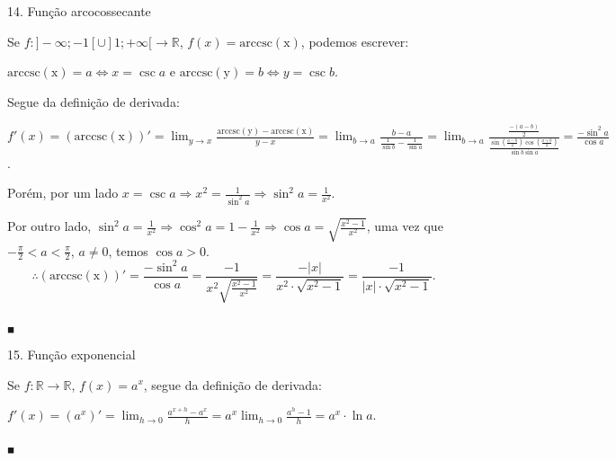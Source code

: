 \documentclass{article}
\begin{document}
{\begin{newpage}
\begin{flushleft}
14. Função arcocossecante
\end{flushleft}
\par Se $f:]-\infty ;-1[ \cup ]1;+\infty[\rightarrow\mathbb{R}$, $f(x)=\operatorname{arccsc(x)}$, podemos escrever:
\par \begin{center} $\operatorname{arccsc(x)} = a\Leftrightarrow x=\csc{a}$ e $\operatorname{arccsc(y)}=b\Leftrightarrow y=\csc{b}$.\end{center}
\vspace{0.3cm}
\par Segue da definição de derivada:
\par $f'(x)=(\operatorname{arccsc(x)})'=\displaystyle{\lim_{y\to x}} \frac{\operatorname{arccsc(y)} - \operatorname{arccsc(x)}}{y-x} =  \displaystyle{\lim_{b\to a}} \frac{b-a}{\frac{1}{\sin{b}} - \frac{1}{\sin{a}}} = \displaystyle{\lim_{b\to a}} \frac{\frac{-(a-b)}{2}}{\frac{\sin{(\frac{a-b}{2})}\cos{(\frac{a+b}{2})}}{\sin{b}\sin{a}}} = \frac{-\sin^2{a}}{\cos{a}}$.
\vspace{0.3cm}
\par Porém, por um lado $x=\csc{a}\Rightarrow\displaystyle{x^2=\frac{1}{\sin^2{a}}\Rightarrow \sin^2{a}=\frac{1}{x^2}}$.
\vspace{0.3cm}
\par Por outro lado, $\sin^2{a}=\displaystyle{\frac{1}{x^2}\Rightarrow \cos^2{a}=1-\frac{1}{x^2}\Rightarrow \cos{a}=\sqrt{\frac{x^2 - 1}{x^2}}}$, uma vez que $\displaystyle{-\frac{\pi }{2}<a<\frac{\pi }{2}}$, $a\neq 0$, temos $\cos{a}>0$.
\vspace{0.3cm}
$$\therefore (\operatorname{arccsc(x)})'=\frac{-\sin^2{a}}{\cos{a}}=\frac{-1}{x^2\sqrt{\frac{x^2 - 1}{x^2}}} =\frac{-|x|}{x^2\cdot\sqrt{x^2 - 1}} = \frac{-1}{|x|\cdot\sqrt{x^2-1}}.$$
\begin{flushright} $_{\blacksquare }$ \end{flushright}
\par
\vspace{0.3cm}
\begin{flushleft}
15. Função exponencial
\end{flushleft}
\par Se $f:\mathbb{R}\rightarrow\mathbb{R}$, $f(x)=a^x$, segue da definição de derivada:
\par $f'(x)=(a^x)'=\displaystyle{\lim_{h\to 0}} \frac{a^{x+h} - a^x}{h} = a^x\displaystyle{\lim_{h\to 0} \frac{a^h - 1}{h}} = a^x\cdot\ln{a}.$\begin{flushright} $_{\blacksquare }$ \end{flushright}

\end{newpage}}
\end{document}

